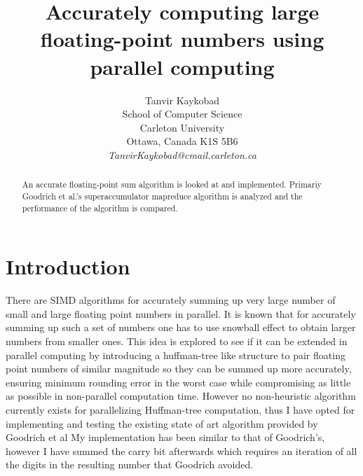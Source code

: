 \documentclass[11pt]{article}       %
\begin{document}


\title{Accurately computing large floating-point numbers using parallel computing}


\author{
Tanvir Kaykobad\\
School of Computer Science\\
Carleton University\\
Ottawa, Canada K1S 5B6\\
{\em TanvirKaykobad@cmail.carleton.ca}
} %

\maketitle

\begin{abstract}
An accurate floating-point sum algorithm is looked at and implemented. Primariy Goodrich et al.'s superaccumulator mapreduce algorithm is analyzed and the performance of the algorithm is compared.
\end{abstract}


\section{Introduction} \label{intro}

There are SIMD algorithms for accurately summing up very large number of small and large floating point numbers in parallel. It is known that for accurately summing up such a set of numbers one has to use snowball effect to obtain larger numbers from smaller ones. This idea is explored to see if it can be extended in parallel computing by introducing a huffman-tree like structure to pair floating point numbers of similar magnitude so they can be summed up more accurately, ensuring minimum rounding error in the worst case while compromising as little as possible in non-parallel computation time. However no non-heuristic algorithm currently exists for parallelizing Huffman-tree computation, thus I have opted for implementing and testing the existing state of art algorithm provided by Goodrich et al \cite{PASFPN} My implementation has been similar to that of Goodrich's, however I have summed the carry bit afterwards which requires an iteration of all the digits in the resulting number that Goodrich avoided.
\end{document}
